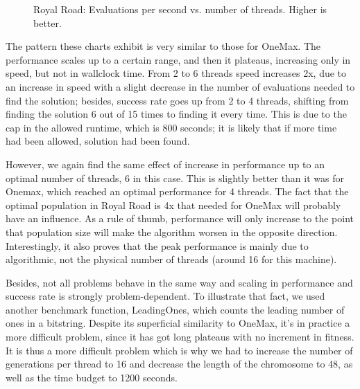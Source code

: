 \documentclass[runningheads]{llncs}\usepackage[]{graphicx}\usepackage[]{color}
\newenvironment{knitrout}{}{} %
\begin{document}
\begin{figure}
  \vspace{-.5\intextsep}
  \hspace*{.2\columnsep}   
  \fbox{\scalebox{.8}{
\begin{knitrout}
\definecolor{shadecolor}{rgb}{0.969, 0.969, 0.969}\color{fgcolor}
\texttt{[image: figure/threads-rr3-1]} 

\end{knitrout}
}}
\caption{Royal Road: Evaluations per second vs. number of threads. Higher is better.}
\label{fig:threads:rr:3}
\end{figure}

The pattern these charts exhibit is very similar to those for
OneMax. The performance scales up to a certain range, and then it
plateaus, increasing only in speed, but not in wallclock time. From 2 to
6 threads speed increases 2x, due to an increase in speed with a
slight decrease in the number of evaluations needed to find the
solution; besides, success rate goes up from 2 to 4 threads, shifting
from finding the solution 6 out of 15 times to finding it every
time. This is due to the cap in the allowed runtime,
which is 800 seconds; it is likely that if more time had been allowed,
solution had been found. 

However, we again find the
same effect of increase in performance up to an optimal number of
threads, 6 in this case. This is slightly better than it was
for Onemax, which reached an optimal performance for 4 threads. The
fact that the optimal population in Royal Road is 4x that needed for
OneMax will probably have an influence. As a rule of
thumb, performance will only increase to the point that population
size will make the algorithm worsen in the opposite
direction. Interestingly, it also proves that the peak performance is mainly
due to algorithmic, not the physical number of threads (around 16 for this machine). 

Besides, not all problems behave in the same way and scaling in
performance and success rate is strongly problem-dependent. To
illustrate that fact, we used another benchmark function, 
LeadingOnes, which counts the leading number of ones in a
bitstring. Despite its superficial similarity to OneMax, it's in practice
a more difficult problem, since it has got long plateaus with no
increment in fitness. It is thus a more difficult problem which is why
we had to increase the number of generations per thread to 16 and
decrease the length of the chromosome to 48, as well as the time
budget to 1200 seconds. 
\end{document}
